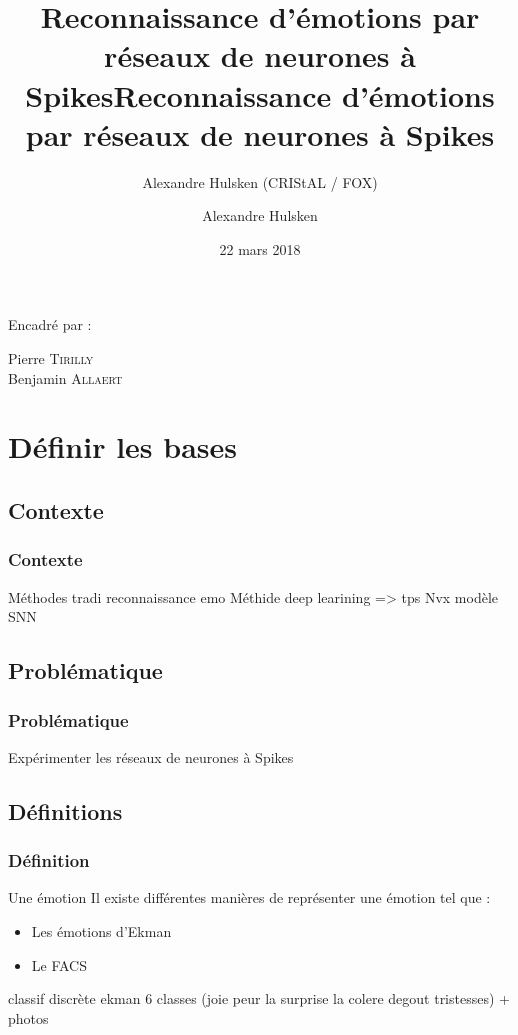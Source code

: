 \documentclass{beamer}
\author{Alexandre Hulsken (CRIStAL / FOX)}
\title{Reconnaissance d'émotions par réseaux de neurones à Spikes}
\title[Label Recherche]{Reconnaissance d’émotions par réseaux de neurones à Spikes}
\author{Alexandre Hulsken}
\institute[IRCICA/FOX]
{
Université des Sciences et Technologie de Lille \\
\medskip
}
\date{22 mars 2018}
\begin{document}
\begin{frame}
\titlepage
\vfill
Encadré par :\par
Pierre \textsc{Tirilly} \\
Benjamin \textsc{Allaert}
\end{frame}


\section{Définir les bases}

\subsection{Contexte}
\begin{frame}
  \frametitle{Contexte}
  Méthodes tradi reconnaissance emo
  Méthide deep learining => tps
  Nvx modèle SNN
\end{frame}


\subsection{Problématique}
\begin{frame}
  \frametitle{Problématique}
  \centering
  \huge{Expérimenter les réseaux de neurones à Spikes}
\end{frame}


\subsection{Définitions}
\begin{frame}
  \frametitle{Définition}
  \begin{block}{Une émotion}
    Il existe différentes manières de représenter une émotion tel que :
    \begin{itemize}
      \item Les émotions d'Ekman
      \item Le FACS
    \end{itemize}
    classif discrète ekman 6 classes (joie peur la surprise la colere degout tristesses) + photos
  \end{block}
\end{frame}
\end{document}
